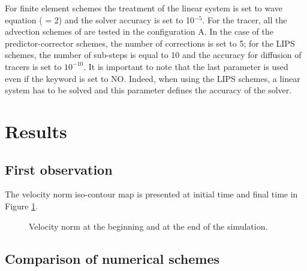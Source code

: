 For finite element schemes the treatment of the linear system is set to wave
equation ( = 2) and the solver accuracy
is set to 10$^{-5}$.
For the tracer, all the advection schemes of  are tested in the
configuration A.
In the case of the predictor-corrector schemes, the number of corrections is set
to 5; for the LIPS schemes, the number of sub-steps is equal to 10 and the
accuracy for diffusion of tracers is set to $10^{-10}$.
It is important to note that the last parameter is used even if the keyword
 is set to NO.
Indeed, when using the LIPS schemes, a linear system has to be solved and this
parameter defines the accuracy of the solver.


\section{Results}

\subsection{First observation}

The velocity norm iso-contour map is presented at initial time and final time
in Figure \ref{fig:res:velocity}.

\begin{figure}[H]
\begin{minipage}[t]{0.5\textwidth}
 \centering
\end{minipage}%
\begin{minipage}[t]{0.5\textwidth}
 \centering
\end{minipage}
 \caption{Velocity norm at the beginning and at the end of the simulation.}
 \label{fig:res:velocity}
\end{figure}


\subsection{Comparison of numerical schemes}

